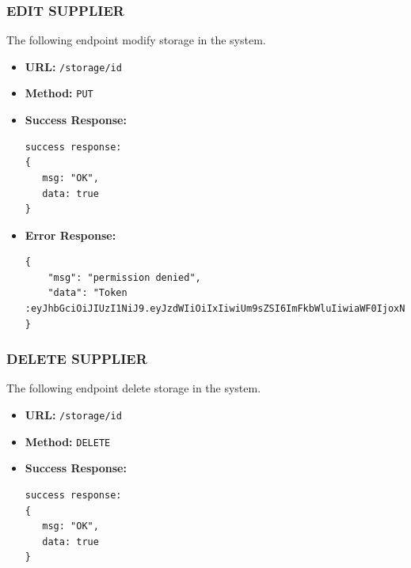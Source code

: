 \subsubsection*{EDIT SUPPLIER}
The following endpoint modify storage in the system.
\begin{itemize}
    \item \textbf{URL:}
    \newline \hspace*{1cm} \texttt{/storage/id}  
    \item \textbf{Method:}
    \newline \hspace*{1cm}\texttt{PUT}
    
    \item \textbf{Success Response:}
\begin{lstlisting}[breaklines]
success response:
{
   msg: "OK",
   data: true
}
\end{lstlisting}
    \item \textbf{Error Response:}
    \begin{lstlisting}[breaklines]
{
    "msg": "permission denied",
    "data": "Token :eyJhbGciOiJIUzI1NiJ9.eyJzdWIiOiIxIiwiUm9sZSI6ImFkbWluIiwiaWF0IjoxNjgyMjgyNDg0LCJleHAiOjE3MTgyODI0ODR9.L8IXQCVJdk_05lYLRSnkkB5kqrSGFS1cPnA7j04kdG8"
}
\end{lstlisting}
\end{itemize}
\subsubsection*{DELETE SUPPLIER}
The following endpoint delete storage in the system.
\begin{itemize}
    \item \textbf{URL:}
    \newline \hspace*{1cm} \texttt{/storage/id}  
    \item \textbf{Method:}
    \newline \hspace*{1cm}\texttt{DELETE}
    \item \textbf{Success Response:}
\begin{lstlisting}[breaklines]
success response:
{
   msg: "OK",
   data: true
}
\end{lstlisting}
\end{itemize}
